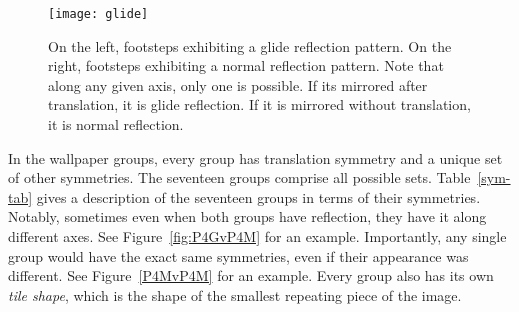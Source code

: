 \begin{figure}
\centering
\texttt{[image: glide]}
\caption{On the left, footsteps exhibiting a glide reflection pattern. On the right, footsteps exhibiting a normal reflection pattern. Note that along any given axis, only one is possible. If its mirrored after translation, it is glide reflection. If it is mirrored without translation, it is normal reflection.}
\label{glide}
\end{figure}

In the wallpaper groups, every group has translation symmetry and a unique set of other symmetries. The seventeen groups comprise all possible sets. Table~\ref{sym-tab} gives a description of the seventeen groups in terms of their symmetries. Notably, sometimes even when both groups have reflection, they have it along different axes. See Figure~\ref{fig:P4GvP4M} for an example. Importantly, any single group would have the exact same symmetries, even if their appearance was different. See Figure~\ref{P4MvP4M} for an example. Every group also has its own \textit{tile shape}, which is the shape of the smallest repeating piece of the image.

